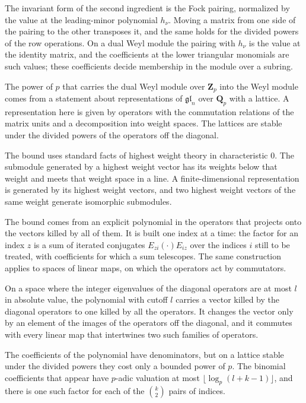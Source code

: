 The invariant form of the second ingredient is the Fock pairing, normalized by the value at the
leading-minor polynomial $h_\nu$. Moving a matrix from one side of the pairing to the other transposes
it, and the same holds for the divided powers of the row operations. On a dual Weyl module the pairing
with $h_\nu$ is the value at the identity matrix, and the coefficients at the lower triangular
monomials are such values; these coefficients decide membership in the module over a subring.

The power of $p$ that carries the dual Weyl module over $\mathbf Z_p$ into the Weyl module comes from
a statement about representations of $\mathfrak{gl}_n$ over $\mathbf Q_p$ with a lattice. A
representation here is given by operators with the commutation relations of the matrix units and a
decomposition into weight spaces. The lattices are stable under the divided powers of the operators off
the diagonal.

The bound uses standard facts of highest weight theory in characteristic $0$. The submodule generated
by a highest weight vector has its weights below that weight and meets that weight space in a line. A
finite-dimensional representation is generated by its highest weight vectors, and two highest weight
vectors of the same weight generate isomorphic submodules.

The bound comes from an explicit polynomial in the operators that projects onto the vectors killed by
all of them. It is built one index at a time: the factor for an index $z$ is a sum of iterated
conjugates $E_{zi}(\cdot)E_{iz}$ over the indices $i$ still to be treated, with coefficients for which
a sum telescopes. The same construction applies to spaces of linear maps, on which the operators act by
commutators.

On a space where the integer eigenvalues of the diagonal operators are at most $l$ in absolute value,
the polynomial with cutoff $l$ carries a vector killed by the diagonal operators to one killed by all
the operators. It changes the vector only by an element of the images of the operators off the
diagonal, and it commutes with every linear map that intertwines two such families of operators.

The coefficients of the polynomial have denominators, but on a lattice stable under the divided powers
they cost only a bounded power of $p$. The binomial coefficients that appear have $p$-adic valuation at
most $\lfloor\log_p(l+k-1)\rfloor$, and there is one such factor for each of the $\binom k2$ pairs of
indices.

